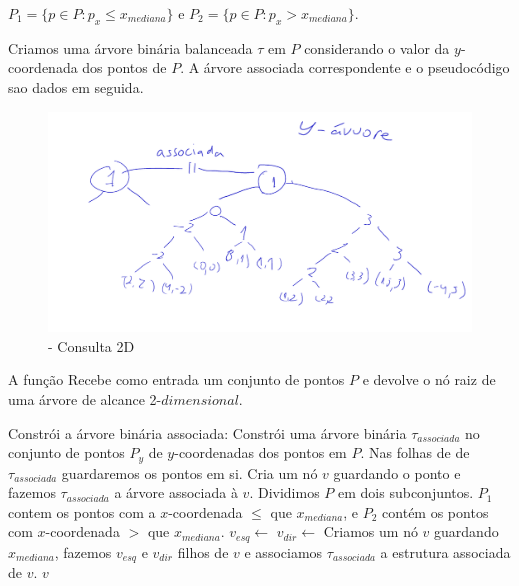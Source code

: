     $P_1 = \{p \in P : p_x \leq x_{mediana}\}$ e $P_2 = \{p \in P : p_x > x_{mediana}\}$.

Criamos uma árvore binária balanceada $\tau$ em $P$ considerando o valor da $y$-coordenada dos pontos
de $P$.
A árvore associada correspondente e o pseudocódigo sao dados em seguida.
\begin{figure}[htb]
    \caption{\label{fig:Fig_16} - Consulta 2D}
    \begin{center}
        \includegraphics[width=\textwidth]{images/assoc_tree.pdf}
    \end{center}
\end{figure}


\begin{algorithm}[H]
    \caption{A função  Recebe como entrada um conjunto de pontos 
    $P$ e devolve o nó raiz de uma árvore de alcance 2-$dimensional$.}
    \begin{algorithmic}[1]
        \State Constrói a árvore binária associada: Constrói uma árvore binária $\tau_{associada}$ no conjunto de pontos
        $P_y$  de $y$-coordenadas dos pontos em $P$. Nas folhas de de $\tau_{associada}$ guardaremos
        os pontos em si.
            \State Cria um nó $v$ guardando o ponto e fazemos $\tau_{associada}$ a árvore associada 
            à $v$.
        \Else
            \State Dividimos $P$ em dois subconjuntos. $P_1$ contem os pontos com a $x$-coordenada $\leq$
            que $x_{mediana}$, e $P_2$ contém os pontos com $x$-coordenada $>$ que $x_{mediana}$.
            \State $v_{esq} \leftarrow $ 
            \State $v_{dir} \leftarrow $ 
            \State Criamos um nó $v$ guardando $x_{mediana}$, fazemos $v_{esq}$ e $v_{dir}$ filhos de 
            $v$ e associamos $\tau_{associada}$ a estrutura associada de $v$.
        \EndIf
    \Return $v$
    \EndFunction
    \end{algorithmic}
\end{algorithm}

